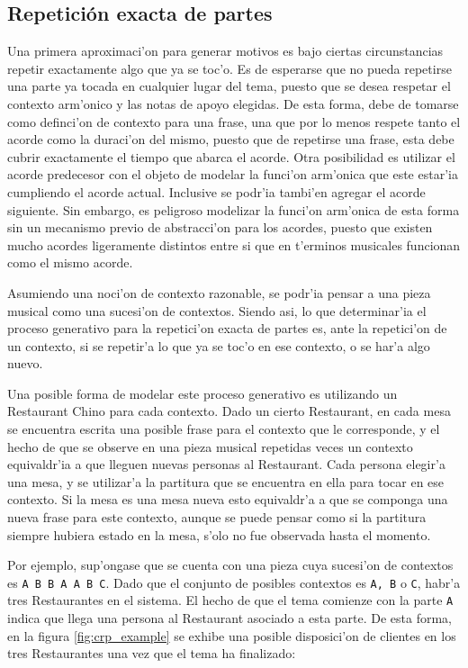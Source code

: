 \subsection{Repetici\'on exacta de partes}
\label{sec:crp_model}
Una primera aproximaci'on para generar motivos es bajo ciertas circunstancias repetir exactamente algo que ya se toc'o. Es de esperarse que no pueda repetirse
una parte ya tocada en cualquier lugar del tema, puesto que se desea respetar el contexto arm'onico y las notas de apoyo elegidas. De esta forma, debe
de tomarse como definci'on de contexto para una frase, una que por lo menos respete tanto el acorde como la duraci'on del mismo, puesto que de repetirse una frase, esta 
debe cubrir exactamente el tiempo que abarca el acorde. Otra posibilidad es utilizar el acorde predecesor con el objeto
de modelar la funci'on arm'onica que este estar'ia cumpliendo el acorde actual. Inclusive se podr'ia tambi'en agregar el acorde siguiente. Sin embargo, es peligroso modelizar
la funci'on arm'onica de esta forma sin un mecanismo previo de abstracci'on para los acordes, puesto que existen mucho acordes ligeramente distintos entre si que en t'erminos
musicales funcionan como el mismo acorde.

Asumiendo una noci'on de contexto razonable, se podr'ia pensar a una pieza musical como una sucesi'on de contextos. Siendo asi, lo que determinar'ia el proceso generativo para 
la repetici'on exacta de partes es, ante la repetici'on de un contexto, si se repetir'a lo que ya se toc'o en ese contexto, o se har'a
algo nuevo. 

Una posible forma de modelar este proceso generativo es utilizando un Restaurant Chino para cada contexto. Dado un cierto Restaurant, en cada mesa se encuentra
escrita una posible frase para el contexto que le corresponde, y el hecho de que se observe en una pieza musical repetidas veces un contexto equivaldr'ia a que lleguen nuevas
personas al Restaurant. Cada persona elegir'a una mesa, y se utilizar'a la partitura que se encuentra en ella para tocar en ese contexto. Si la mesa es una mesa 
nueva esto equivaldr'a a que se componga una nueva frase para este contexto, aunque se puede pensar como si la partitura siempre hubiera estado en la mesa, s'olo 
no fue observada hasta el momento.  

Por ejemplo, sup'ongase que se cuenta con una pieza cuya sucesi'on de contextos es \texttt{A B B A A B C}. Dado que el conjunto de posibles contextos es
\texttt{A, B} o \texttt{C}, habr'a tres Restaurantes en el sistema. El hecho de que el tema comienze con la parte \texttt{A} indica que llega una persona al 
Restaurant asociado a esta parte. De esta forma, en la figura \ref{fig:crp_example} se exhibe una posible disposici'on de clientes en los tres Restaurantes 
una vez que el tema ha finalizado:

